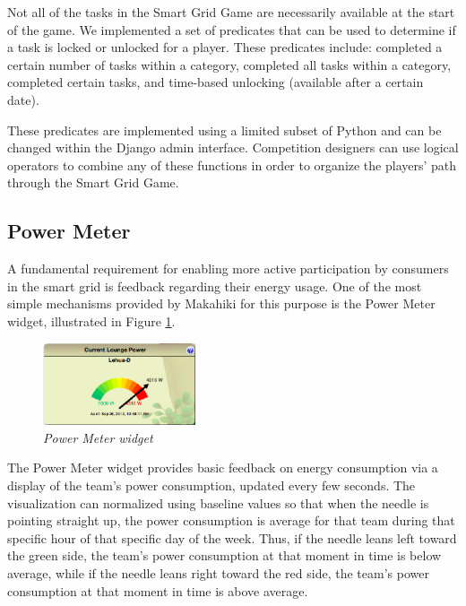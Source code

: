 Not all of the tasks in the Smart Grid Game are necessarily available at
the start of the game. We implemented a set of predicates that can be used to determine if a task is locked or unlocked for a player. These predicates include: completed a certain number of tasks within a category, completed all tasks within a category, completed certain tasks, and time-based unlocking (available after a certain date).

These predicates are implemented using a limited subset of Python and can
be changed within the Django admin interface. Competition designers can use
logical operators to combine any of these functions in order to organize
the players' path through the Smart Grid Game.

\subsection{Power Meter}

A fundamental requirement for enabling more active participation by consumers in the smart grid is feedback regarding their energy usage.  One of the most simple mechanisms provided by Makahiki for this purpose is the Power Meter widget, illustrated in Figure \ref{fig:PowerMeter}.

\begin{figure}[th]
  \center
  \includegraphics[width=0.4\textwidth]{power-meter.eps}
  \caption{\em \small Power Meter widget}
  \label{fig:PowerMeter}
\end{figure}

The Power Meter widget provides basic feedback on energy consumption via a display of the team's power consumption, updated every few seconds.  The visualization can normalized using baseline values so that when the needle is pointing straight up, the power consumption is average for that team during that specific hour of that specific day of the week.  Thus, if the needle leans left toward the green side, the team's power consumption at that moment in time is below average, while if the needle leans right toward the red side, the team's power consumption at that moment in time is above average.  

